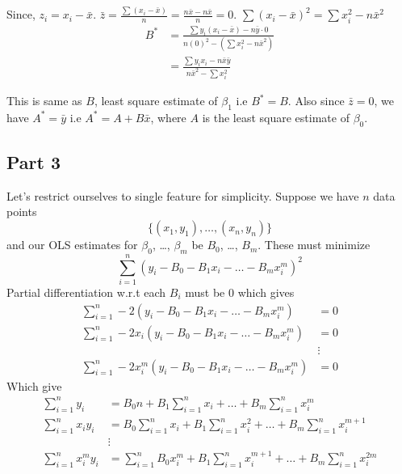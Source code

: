Since, $z_i=x_i-\bar{x}$. $\bar{z} = \frac{\sum (x_i - \bar{x})}{n} = \frac{n\bar{x} - n\bar{x}}{n} = 0$. $\sum (x_i-\bar{x})^2 = \sum x_i^2 - n\bar{x}^2$
\begin{align}
	B^* & = \frac{\sum y_i(x_i-\bar{x}) - n\bar{y}\cdot 0}{n(0)^2 - (\sum x_i^2 - n\bar{x}^2)} \\
	    & = \frac{\sum y_ix_i - n\bar{x}\bar{y}}{n\bar{x}^2 - \sum x_i^2}
\end{align}

This is same as $B$, least square estimate of $\beta_1$ i.e $B^* = B$. Also
since $\bar{z} = 0$, we have $A^* = \bar{y}$ i.e $A^* = A + B\bar{x}$, where
$A$ is the least square estimate of $\beta_0$.

\subsection{Part 3}
Let's restrict ourselves to single feature for simplicity. Suppose we have
$n$ data points
\begin{equation}
	\{(x_1, y_1),\dots, (x_n, y_n)\}
\end{equation}
and our OLS estimates for $\beta_0$, \dots, $\beta_m$
be $B_0$, \dots, $B_m$. These must minimize
\begin{equation}
	\sum_{i=1}^{n} (y_i - B_0 - B_1x_i - \dots - B_mx_i^m)^2
\end{equation}
Partial differentiation w.r.t each $B_i$ must be $0$ which gives
\begin{align}
	\sum_{i=1}^{n} -2(y_i - B_0 - B_1x_i - \dots - B_mx_i^m)      & = 0    \\
	\sum_{i=1}^{n} -2x_i(y_i - B_0 - B_1x_i - \dots - B_mx_i^m)   & = 0    \\
	                                                              & \vdots \\
	\sum_{i=1}^{n} -2x_i^m(y_i - B_0 - B_1x_i - \dots - B_mx_i^m) & = 0
\end{align}
Which give
\begin{align}
	\sum_{i=1}^n y_i      & = B_0n + B_1\sum_{i=1}^nx_i + \dots + B_m\sum_{i=1}^nx_i^m                          \\
	\sum_{i=1}^n x_iy_i   & = B_0\sum_{i=1}^nx_i + B_1\sum_{i=1}^nx_i^2 + \dots + B_m\sum_{i=1}^nx_i^{m+1}      \\
	                      & \vdots                                                                              \\
	\sum_{i=1}^n x_i^my_i & = \sum_{i=1}^nB_0x_i^m + B_1\sum_{i=1}^nx_i^{m+1} + \dots + B_m\sum_{i=1}^nx_i^{2m}
\end{align}

